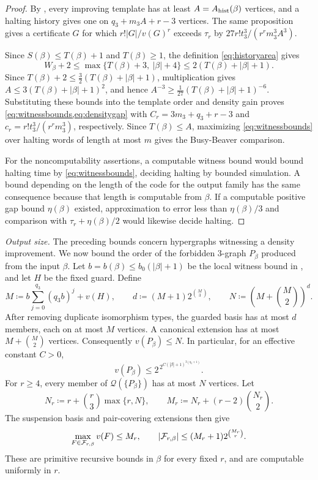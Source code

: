 \documentclass[10pt]{article}
\numberwithin{equation}{section}
\theoremstyle{definition}
\newcommand{\cQ}{\mathcal Q}\newcommand{\cR}{\mathcal R}\newcommand{\cS}{\mathcal S}
\begin{document}
\begin{proof}
By , every improving template has at least $A=A_{\rm hist}(\beta)$ vertices, and a halting history gives one on $q_3+m_3A+r-3$ vertices. The same proposition gives a certificate $G$ for which $r!|G|/v(G)^r$ exceeds $\tau_r$ by $27r!t_3^3/(r^rm_3^3A^3)$.

Since $S(\beta)\le T(\beta)+1$ and $T(\beta)\ge1$, the definition \eqref{eq:historyarea} gives
\[
 W_\beta+2\le\max\{T(\beta)+3,\ |\beta|+4\}
            \le2(T(\beta)+|\beta|+1).
\]
Since $T(\beta)+2\le\frac32(T(\beta)+|\beta|+1)$, multiplication gives $A\le3(T(\beta)+|\beta|+1)^2$, and hence $A^{-3}\ge\frac1{27}(T(\beta)+|\beta|+1)^{-6}$. Substituting these bounds into the template order and density gain proves \cref{eq:witnessbounds,eq:densitygap} with $C_r=3m_3+q_3+r-3$ and $c_r=r!t_3^3/(r^rm_3^3)$, respectively. Since $T(\beta)\le A$, maximizing \eqref{eq:witnessbounds} over halting words of length at most $m$ gives the Busy-Beaver comparison.

For the noncomputability assertions, a computable witness bound would bound halting time by \eqref{eq:witnessbounds}, deciding halting by bounded simulation. A bound depending on the length of the code for the output family has the same consequence because that length is computable from $\beta$. If a computable positive gap bound $\eta(\beta)$ existed, approximation to error less than $\eta(\beta)/3$ and comparison with $\tau_r+\eta(\beta)/2$ would likewise decide halting.
\end{proof}

\emph{Output size.} The preceding bounds concern hypergraphs witnessing a density improvement. We now bound the order of the forbidden $3$-graph $P_\beta$ produced from the input $\beta$. Let $b=b(\beta)\le b_0(|\beta|+1)$ be the local witness bound in , and let $H$ be the fixed guard. Define
\[
 M\coloneqq b\sum_{j=0}^{q_3}(q_3b)^j+v(H),\qquad
 d\coloneqq(M+1)2^{\binom M3},\qquad
 N\coloneqq\left(M+\binom M2\right)^d.
\]
After removing duplicate isomorphism types, the guarded basis has at most $d$ members, each on at most $M$ vertices. A canonical extension has at most $M+\binom M2$ vertices. Consequently $v(P_\beta)\le N$. In particular, for an effective constant $C>0$,
\[
 v(P_\beta)\le 2^{\,2^{C(|\beta|+1)^{3(q_3+1)}}}.
\]
For $r\ge4$, every member of $\cQ(\{P_\beta\})$ has at most $N$ vertices. Let
\[
 N_r\coloneqq r+\binom r3\max\{r,N\},\qquad
 M_r\coloneqq N_r+(r-2)\binom{N_r}2.
\]
The suspension basis and pair-covering extensions then give
\[
 \max_{F\in\mathcal F_{r,\beta}}v(F)\le M_r,\qquad
 |\mathcal F_{r,\beta}|\le(M_r+1)2^{\binom{M_r}r}.
\]
These are primitive recursive bounds in $\beta$ for every fixed $r$, and are computable uniformly in $r$.
\end{document}
